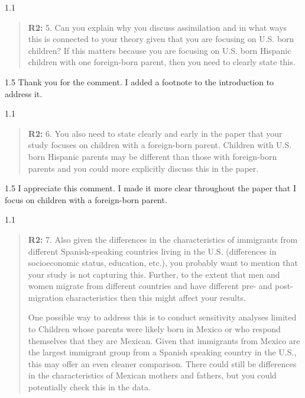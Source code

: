\documentclass[12pt,english]{article}
\newcommand{\rrquote}{1.1}
\newcommand{\rrxspc}{1.5}
\begin{document}
\begin{refsection}
    \begin{spacing}{\rrquote}
        \begin{quotation}
        \textbf{R2: } 5. Can you explain why you discuss assimilation and in what ways this is connected to your theory given that you are focusing on U.S. born children? If this matters because you are focusing on U.S. born Hispanic children with one foreign-born parent, then you need to clearly state this.
        \end{quotation}
        \end{spacing}
        
        \begin{spacing}{\rrxspc}
            Thank you for the comment. I added a footnote to the introduction to address it. 
    \end{spacing}

    \begin{spacing}{\rrquote}
        \begin{quotation}
        \textbf{R2: } 6. You also need to state clearly and early in the paper that your study focuses on children with a foreign-born parent. Children with U.S. born Hispanic parents may be different than those with foreign-born parents and you could more explicitly discuss this in the paper.
        \end{quotation}
        \end{spacing}
        
        \begin{spacing}{\rrxspc}
            I appreciate this comment. I made it more clear throughout the paper that I focus on children with a foreign-born parent. 
    \end{spacing}

    \begin{spacing}{\rrquote}
        \begin{quotation}
        \textbf{R2: } 7. Also given the differences in the characteristics of immigrants from different Spanish-speaking countries living in the U.S. (differences in socioeconomic status, education, etc.), you probably want to mention that your study is not capturing this. Further, to the extent that men and women migrate from different countries and have different pre- and post-migration characteristics then this might affect your results.

        One possible way to address this is to conduct sensitivity analyses limited to Children whose parents were likely born in Mexico or who respond themselves that they are Mexican. Given that immigrants from Mexico are the largest immigrant group from a Spanish speaking country in the U.S., this may offer an even cleaner comparison. There could still be differences in the characteristics of Mexican mothers and fathers, but you could potentially check this in the data.        
        \end{quotation}
        \end{spacing}
        

\end{refsection}
\end{document}
